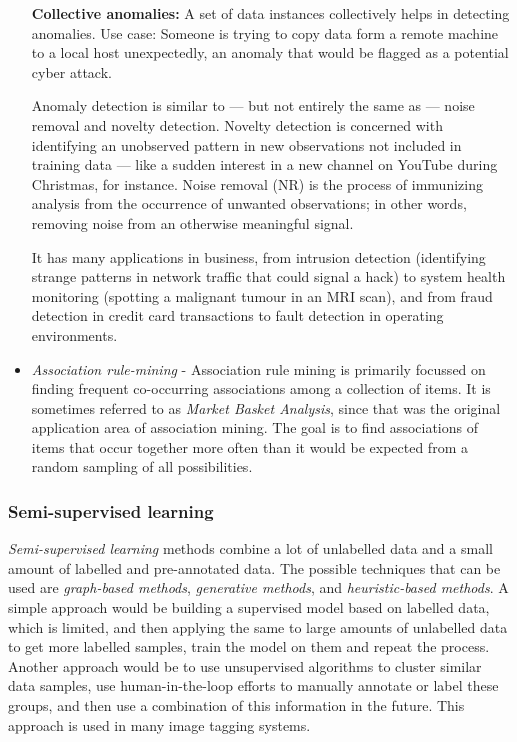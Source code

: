 \documentclass[12pt,a4paper]{article}
\begin{document}
\begin{itemize}
    \textbf{Collective anomalies:} A set of data instances collectively helps in detecting anomalies. Use case: Someone is trying to copy data form a remote machine to a local host unexpectedly, an anomaly that would be flagged as a potential cyber attack.

    Anomaly detection is similar to — but not entirely the same as — noise removal and novelty detection. Novelty detection is concerned with identifying an unobserved pattern in new observations not included in training data — like a sudden interest in a new channel on YouTube during Christmas, for instance. Noise removal (NR) is the process of immunizing analysis from the occurrence of unwanted observations; in other words, removing noise from an otherwise meaningful signal.

    It has many applications in business, from intrusion detection (identifying strange patterns in network traffic that could signal a hack) to system health monitoring (spotting a malignant tumour in an MRI scan), and from fraud detection in credit card transactions to fault detection in operating environments.
    \item \textit{Association rule-mining} - Association rule mining is primarily focussed on finding frequent co-occurring associations among a collection of items. It is sometimes referred to as \textit{Market Basket Analysis}, since that was the original application area of association mining. The goal is to find associations of items that occur together more often than it would be expected from a random sampling of all possibilities.
\end{itemize}

\subsubsection{Semi-supervised learning}
\textit{Semi-supervised learning} methods combine a lot of unlabelled data and a small amount of labelled and pre-annotated data. The possible techniques that can be used are \textit{graph-based methods}, \textit{generative methods}, and \textit{heuristic-based methods}.
A simple approach would be building a supervised model based on labelled data, which is limited, and
then applying the same to large amounts of unlabelled data to get more labelled samples, train the model on them and repeat the process. Another approach would be to use unsupervised algorithms to cluster similar data samples, use human-in-the-loop efforts to manually annotate or label these groups, and then use a combination of this information in the future. This approach is used in many image tagging systems.
\end{document}
